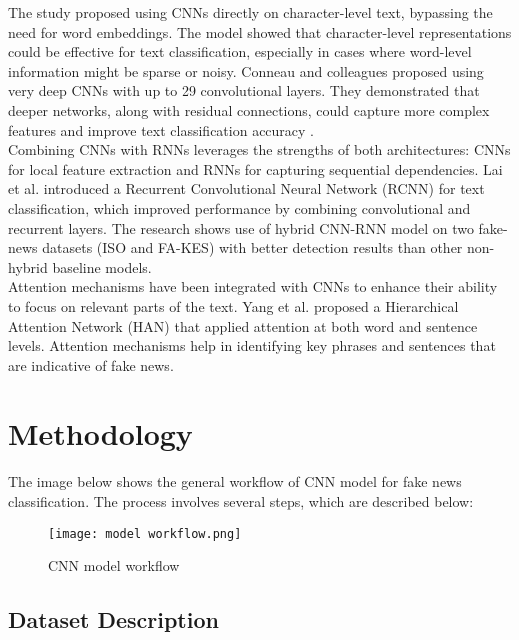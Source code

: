 The study \cite{zhang2016characterlevel} proposed using CNNs directly on character-level text, bypassing the need for word embeddings. The model showed that character-level representations could be effective for text classification, especially in cases where word-level information might be sparse or noisy. Conneau and colleagues proposed using very deep CNNs with up to 29 convolutional layers. They demonstrated that deeper networks, along with residual connections, could capture more complex features and improve text classification accuracy \cite{conneau2017deep}.\\

Combining CNNs with RNNs leverages the strengths of both architectures: CNNs for local feature extraction and RNNs for capturing sequential dependencies. Lai et al. introduced a Recurrent Convolutional Neural Network (RCNN) \cite{Lai2015RecurrentCN} for text classification, which improved performance by combining convolutional and recurrent layers.  The research \cite{hybrid-cnn-rnn} shows use of hybrid CNN-RNN model on two fake-news datasets (ISO and FA-KES) with better detection results than other non-hybrid baseline models.\\

Attention mechanisms have been integrated with CNNs to enhance their ability to focus on relevant parts of the text. Yang et al. proposed a Hierarchical Attention Network (HAN) \cite{yang-etal-2016-hierarchical} that applied attention at both word and sentence levels.  Attention mechanisms help in identifying key phrases and sentences that are indicative of fake news. \\

\clearpage
\section{Methodology}

The image below shows the general workflow of CNN model for fake news classification. The process involves several steps, which are described below:

\begin{figure}[h]
    \centering
    \texttt{[image: model workflow.png]}
    \caption{CNN model workflow}
    \label{fig:cnn workflow}
\end{figure}

\clearpage
\subsection{Dataset Description}

